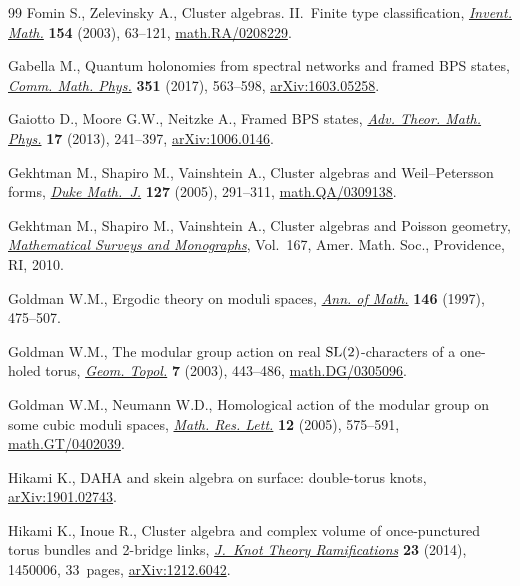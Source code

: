\begin{thebibliography}{99}
Fomin S., Zelevinsky A., Cluster algebras. {II}.~{F}inite type classification,
 \href{https://doi.org/10.1007/s00222-003-0302-y}{\textit{Invent. Math.}} \textbf{154} (2003), 63--121,
 \href{https://arxiv.org/abs/math.RA/0208229}{math.RA/0208229}.

Gabella M., Quantum holonomies from spectral networks and framed {BPS} states,
 \href{https://doi.org/10.1007/s00220-016-2729-1}{\textit{Comm. Math. Phys.}} \textbf{351} (2017), 563--598,
 \href{https://arxiv.org/abs/1603.05258}{arXiv:1603.05258}.

Gaiotto D., Moore G.W., Neitzke A., Framed {BPS} states, \href{https://doi.org/10.4310/ATMP.2013.v17.n2.a1}{\textit{Adv. Theor.
 Math. Phys.}} \textbf{17} (2013), 241--397, \href{https://arxiv.org/abs/1006.0146}{arXiv:1006.0146}.

Gekhtman M., Shapiro M., Vainshtein A., Cluster algebras and
 {W}eil--{P}etersson forms, \href{https://doi.org/10.1215/S0012-7094-04-12723-X}{\textit{Duke Math.~J.}} \textbf{127} (2005),
 291--311, \href{https://arxiv.org/abs/math.QA/0309138}{math.QA/0309138}.

Gekhtman M., Shapiro M., Vainshtein A., Cluster algebras and {P}oisson
 geometry, \href{https://doi.org/10.1090/surv/167}{\textit{Mathematical Surveys and Monographs}}, Vol.~167, Amer. Math.
 Soc., Providence, RI, 2010.

Goldman W.M., Ergodic theory on moduli spaces, \href{https://doi.org/10.2307/2952454}{\textit{Ann. of Math.}}
 \textbf{146} (1997), 475--507.

Goldman W.M., The modular group action on real {${\rm SL}(2)$}-characters of a
 one-holed torus, \href{https://doi.org/10.2140/gt.2003.7.443}{\textit{Geom. Topol.}} \textbf{7} (2003), 443--486,
 \href{https://arxiv.org/abs/math.DG/0305096}{math.DG/0305096}.

Goldman W.M., Neumann W.D., Homological action of the modular group on some
 cubic moduli spaces, \href{https://doi.org/10.4310/MRL.2005.v12.n4.a11}{\textit{Math. Res. Lett.}} \textbf{12} (2005), 575--591,
 \href{https://arxiv.org/abs/math.GT/0402039}{math.GT/0402039}.

Hikami K., {DAHA} and skein algebra on surface: double-torus knots,
 \href{https://arxiv.org/abs/1901.02743}{arXiv:1901.02743}.

Hikami K., Inoue R., Cluster algebra and complex volume of once-punctured torus
 bundles and 2-bridge links, \href{https://doi.org/10.1142/S0218216514500060}{\textit{J.~Knot Theory Ramifications}} \textbf{23}
 (2014), 1450006, 33~pages, \href{https://arxiv.org/abs/1212.6042}{arXiv:1212.6042}.


\end{thebibliography}

